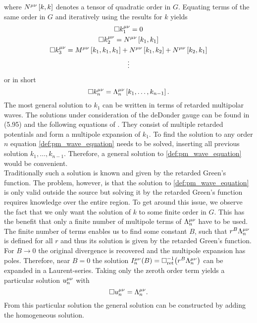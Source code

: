 where $N^{\mu\nu}\left[ k, k\right]$ denotes a tensor of quadratic order in $G$. Equating terms of the same order in $G$ and iteratively using the results for $k$ yields
\begin{gather}
\Box k^{\mu\nu}_1=0\\
\Box k^{\mu\nu}_2 = N^{\mu\nu}\left[k_1, k_1\right]\\
\Box k^{\mu\nu}_3 = M^{\mu\nu}\left[k_1, k_1, k_1\right]+N^{\mu\nu}\left[k_1,k_2\right]+N^{\mu\nu}\left[k_2,k_1\right]\\
\vdots\nonumber
\end{gather}
or in short
\begin{equation}\label{def:pm_wave_equation}
\Box k^{\mu\nu}_n=\Lambda^{\mu\nu}_n\left[k_1, \dotsc, k_{n-1}\right].
\end{equation}
The most general solution to $k_1$ can be written in terms of retarded multipolar waves. The solutions under consideration of the deDonder gauge can be found in (5.95) and the following equations of \cite{gwv1}. They consist of multiple retarded potentials and form a multipole expansion of $k_1$. To find the solution to any order $n$ equation \eqref{def:pm_wave_equation} needs to be solved, inserting all previous solution $k_1,\dotsc,k_{n-1}$. Therefore, a general solution to \eqref{def:pm_wave_equation} would be convenient.\\
Traditionally such a solution is known and given by the retarded Green's function. The problem, however, is that the solution to \eqref{def:pm_wave_equation} is only valid outside the source but solving it by the retarded Green's function requires knowledge over the entire region. To get around this issue, we observe the fact that we only want the solution of $k$ to some finite order in $G$. This has the benefit that only a finite number of multipole terms of $\Lambda^{\mu\nu}_n$ have to be used. The finite number of terms enables us to find some constant $B$, such that $r^B\Lambda^{\mu\nu}_n$ is defined for all $r$ and thus its solution is given by the retarded Green's function. For $B\to 0$ the original divergence is recovered and the multipole expansion has poles. Therefore, near $B=0$ the solution $I^{\mu\nu}_n{\left( B \right)}=\Box^{-1}_\text{ret}{\left( r^B\Lambda^{\mu\nu}_n \right)}$ can be expanded in a Laurent-series. Taking only the zeroth order term yields a particular solution $u^{\mu\nu}_n$ with
\begin{equation}
\Box u^{\mu\nu}_n=\Lambda^{\mu\nu}_n.
\end{equation}
From this particular solution the general solution can be constructed by adding the homogeneous solution.\medskip\\
